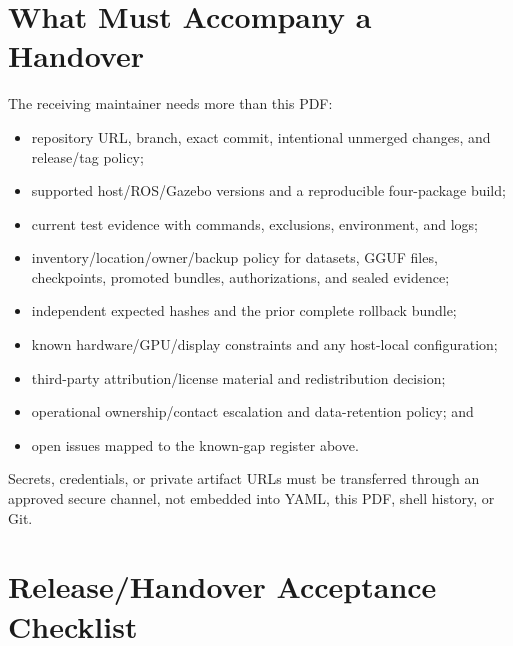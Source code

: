 \section{What Must Accompany a Handover}

The receiving maintainer needs more than this PDF:

\begin{itemize}
  \item repository URL, branch, exact commit, intentional unmerged changes, and
        release/tag policy;
  \item supported host/ROS/Gazebo versions and a reproducible four-package build;
  \item current test evidence with commands, exclusions, environment, and logs;
  \item inventory/location/owner/backup policy for datasets, GGUF files,
        checkpoints, promoted bundles, authorizations, and sealed evidence;
  \item independent expected hashes and the prior complete rollback bundle;
  \item known hardware/GPU/display constraints and any host-local configuration;
  \item third-party attribution/license material and redistribution decision;
  \item operational ownership/contact escalation and data-retention policy; and
  \item open issues mapped to the known-gap register above.
\end{itemize}

Secrets, credentials, or private artifact URLs must be transferred through an
approved secure channel, not embedded into YAML, this PDF, shell history, or
Git.

\section{Release/Handover Acceptance Checklist}

